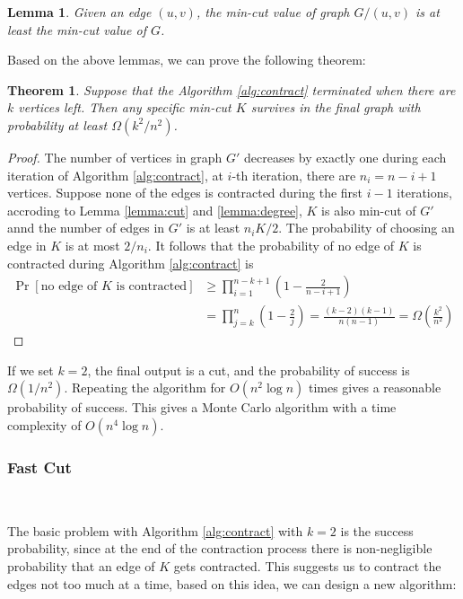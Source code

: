\documentclass[12pt]{article}
\theoremstyle{plain}
\newtheorem{lemma}{Lemma}[section]
\newtheorem{theorem}{Theorem}[section]
\begin{document}
\begin{lemma}
    \label{lemma:contract}
    Given an edge $(u,v)$, the min-cut value of graph $G/(u,v)$ is at least the min-cut value of $G$.
\end{lemma}

Based on the above lemmas, we can prove the following theorem:

\begin{theorem}
    \label{theorem:contract}
    Suppose that the Algorithm \ref{alg:contract} terminated when there are $k$ vertices left. Then any specific min-cut $K$ survives in the final graph with probability at least $\Omega(k^2/n^2)$.
\end{theorem}
\begin{proof}
    The number of vertices in graph $G'$ decreases by exactly one during each iteration of Algorithm \ref{alg:contract}, at $i$-th iteration, there are $n_i=n-i+1$ vertices. Suppose none of the edges is contracted during the first $i-1$ iterations, accroding to Lemma \ref{lemma:cut} and \ref{lemma:degree}, $K$ is also min-cut of $G'$ annd the number of edges in $G'$ is at least $n_iK/2$. The probability of choosing an edge in $K$ is at most $2/n_i$. It follows that the probability of no edge of $K$ is contracted during Algorithm \ref{alg:contract} is
\begin{align*}
    \Pr[\text{no edge of }K\text{ is contracted}]&\ge\prod_{i=1}^{n-k+1}\left(1-\frac{2}{n-i+1}\right)\\
    &=\prod_{j=k}^n\left(1-\frac{2}{j}\right)=\frac{(k-2)(k-1)}{n(n-1)}=\Omega\left(\frac{k^2}{n^2}\right)
\end{align*}
\end{proof}


If we set $k=2$, the final output is a cut, and the probability of success is $\Omega(1/n^2)$. Repeating the algorithm for $O(n^2\log n)$ times gives a reasonable probability of success. This gives a Monte Carlo algorithm with a time complexity of $O(n^4\log n)$.

\subsubsection{Fast Cut}\

The basic problem with Algorithm \ref{alg:contract} with $k=2$ is the success probability, since at the end of the contraction process there is non-negligible probability that an edge of $K$ gets contracted. This suggests us to contract the edges not too much at a time, based on this idea, we can design a new algorithm:
\end{document}
